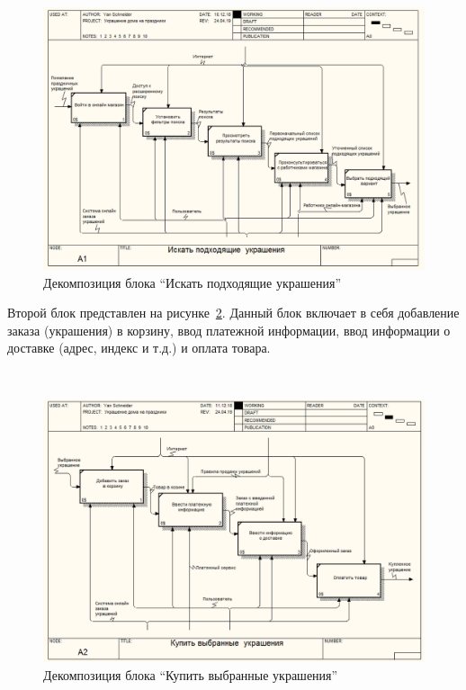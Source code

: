  ~
\begin{figure}[H]
\centering
	\includegraphics[scale=0.45]{figures/functionalModel/a1_search.png}
	\caption{Декомпозиция блока \enquote{Искать подходящие украшения}}
	\label{fig:analysis:functionalModel:a1_search}
\end{figure}

Второй блок представлен на рисунке~\ref{fig:analysis:functionalModel:a2_buy}. Данный блок включает в себя добавление заказа (украшения) в корзину, ввод платежной информации, ввод информации о доставке (адрес, индекс и т.д.) и оплата товара.

 ~
\begin{figure}[H]
\centering
	\includegraphics[scale=0.45]{figures/functionalModel/a2_buy.png}
	\caption{Декомпозиция блока \enquote{Купить выбранные украшения}}
	\label{fig:analysis:functionalModel:a2_buy}
\end{figure}

